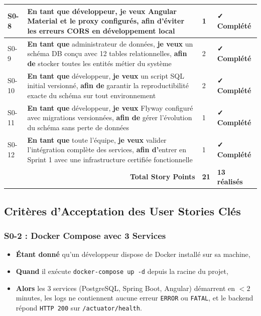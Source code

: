 \documentclass[12pt,a4paper]{report}
\begin{document}
\begin{table}[H]
\begin{tabular}{|p{0.4cm}|p{7.5cm}|p{1.5cm}|p{3cm}|}
\hline
S0-8 & \textbf{En tant que} développeur, \textbf{je veux} Angular Material et le proxy configurés, \textbf{afin d'}éviter les erreurs CORS en développement local & 1 & \textbf{✓ Complété} \\
\hline
S0-9 & \textbf{En tant que} administrateur de données, \textbf{je veux} un schéma DB conçu avec 12 tables relationnelles, \textbf{afin de} stocker toutes les entités métier du système & 2 & \textbf{✓ Complété} \\
\hline
S0-10 & \textbf{En tant que} développeur, \textbf{je veux} un script SQL initial versionné, \textbf{afin de} garantir la reproductibilité exacte du schéma sur tout environnement & 2 & \textbf{✓ Complété} \\
\hline
S0-11 & \textbf{En tant que} développeur, \textbf{je veux} Flyway configuré avec migrations versionnées, \textbf{afin de} gérer l'évolution du schéma sans perte de données & 1 & \textbf{✓ Complété} \\
\hline
S0-12 & \textbf{En tant que} toute l'équipe, \textbf{je veux} valider l'intégration complète des services, \textbf{afin d'}entrer en Sprint 1 avec une infrastructure certifiée fonctionnelle & 1 & \textbf{✓ Complété} \\
\hline
\multicolumn{2}{|r|}{\textbf{Total Story Points}} & \textbf{21} & \textbf{13 réalisés} \\
\hline
\end{tabular}
\end{table}

\subsection{Critères d'Acceptation des User Stories Clés}

\subsubsection{S0-2 : Docker Compose avec 3 Services}
\begin{itemize}[itemsep=0.2em]
    \item \textbf{Étant donné} qu'un développeur dispose de Docker installé sur sa machine,
    \item \textbf{Quand} il exécute \texttt{docker-compose up -d} depuis la racine du projet,
    \item \textbf{Alors} les 3 services (PostgreSQL, Spring Boot, Angular) démarrent en $< 2$ minutes, les logs ne contiennent aucune erreur \texttt{ERROR} ou \texttt{FATAL}, et le backend répond \texttt{HTTP 200} sur \texttt{/actuator/health}.
\end{itemize}
\end{document}
